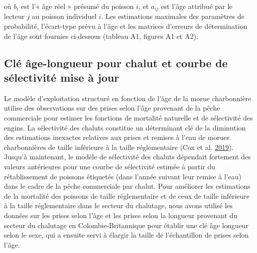 \documentclass[11pt]{book}
\begin{document}
où \(b_i\) est l'« âge réel » présumé du poisson \(i\), et \(a_{ij}\) est l'âge attribué par le lecteur \(j\) au poisson individuel \(i\). Les estimations maximales des paramètres de probabilité, l'écart-type prévu à l'âge et les matrices d'erreurs de détermination de l'âge sont fournies ci-dessous (tableau A1, figures A1 et A2).

\hypertarget{cluxe9-uxe2ge-longueur-pour-chalut-et-courbe-de-suxe9lectivituxe9-mise-uxe0-jour}{%
\subsection{Clé âge-longueur pour chalut et courbe de sélectivité mise à jour}\label{cluxe9-uxe2ge-longueur-pour-chalut-et-courbe-de-suxe9lectivituxe9-mise-uxe0-jour}}

Le modèle d'exploitation structuré en fonction de l'âge de la morue charbonnière utilise des observations sur des prises selon l'âge provenant de la pêche commerciale pour estimer les fonctions de mortalité naturelle et de sélectivité des engins. La sélectivité des chaluts constitue un déterminant clé de la diminution des estimations inexactes relatives aux prises et remises à l'eau de morues charbonnières de taille inférieure à la taille réglementaire (Cox et al. \protect\hyperlink{ref-cox2019evaluating}{2019}). Jusqu'à maintenant, le modèle de sélectivité des chaluts dépendait fortement des valeurs antérieures pour une courbe de sélectivité estimée à partir du rétablissement de poissons étiquetés (dans l'année suivant leur remise à l'eau) dans le cadre de la pêche commerciale par chalut. Pour améliorer les estimations de la mortalité des poissons de taille réglementaire et de ceux de taille inférieure à la taille réglementaire dans le secteur du chalutage, nous avons utilisé les données sur les prises selon l'âge et les prises selon la longueur provenant du secteur du chalutage en Colombie-Britannique pour établir une clé âge longueur selon le sexe, qui a ensuite servi à élargir la taille de l'échantillon de prises selon l'âge.
\end{document}

